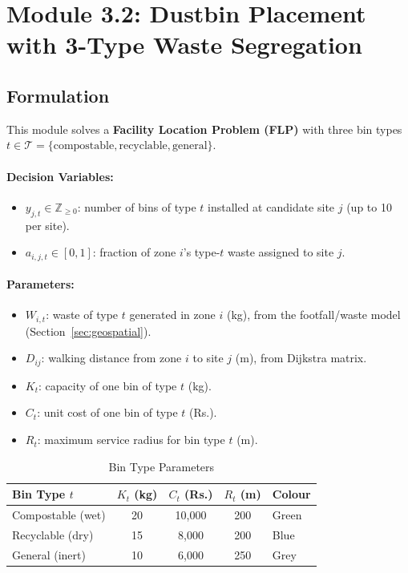 \documentclass[11pt,a4paper]{article}
\begin{document}
\section{Module 3.2: Dustbin Placement with 3-Type Waste Segregation}
\label{sec:mod32}

\subsection{Formulation}

This module solves a \textbf{Facility Location Problem (FLP)} with three bin types $t \in \mathcal{T} = \{\text{compostable}, \text{recyclable}, \text{general}\}$.

\paragraph{Decision Variables:}
\begin{itemize}
    \item $y_{j,t} \in \mathbb{Z}_{\ge 0}$: number of bins of type $t$ installed at candidate site $j$ (up to 10 per site).
    \item $a_{i,j,t} \in [0,1]$: fraction of zone $i$'s type-$t$ waste assigned to site $j$.
\end{itemize}

\paragraph{Parameters:}
\begin{itemize}
    \item $W_{i,t}$: waste of type $t$ generated in zone $i$ (kg), from the footfall/waste model (Section~\ref{sec:geospatial}).
    \item $D_{ij}$: walking distance from zone $i$ to site $j$ (m), from Dijkstra matrix.
    \item $K_t$: capacity of one bin of type $t$ (kg).
    \item $C_t$: unit cost of one bin of type $t$ (Rs.).
    \item $R_t$: maximum service radius for bin type $t$ (m).
\end{itemize}

\begin{table}[H]
\centering
\caption{Bin Type Parameters}
\begin{tabular}{lcccl}
\toprule
\textbf{Bin Type $t$} & \textbf{$K_t$ (kg)} & \textbf{$C_t$ (Rs.)} & \textbf{$R_t$ (m)} & \textbf{Colour} \\ \midrule
Compostable (wet) & 20 & 10,000 & 200 & Green \\
Recyclable (dry)  & 15 &  8,000 & 200 & Blue \\
General (inert)   & 10 &  6,000 & 250 & Grey \\
\bottomrule
\end{tabular}
\end{table}
\end{document}
